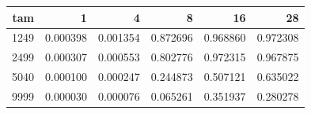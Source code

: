 \begin{tabular}{rrrrrr}
\toprule
tam & 1 & 4 & 8 & 16 & 28 \\
\midrule
1249 & 0.000398 & 0.001354 & 0.872696 & 0.968860 & 0.972308 \\
2499 & 0.000307 & 0.000553 & 0.802776 & 0.972315 & 0.967875 \\
5040 & 0.000100 & 0.000247 & 0.244873 & 0.507121 & 0.635022 \\
9999 & 0.000030 & 0.000076 & 0.065261 & 0.351937 & 0.280278 \\
\bottomrule
\end{tabular}

